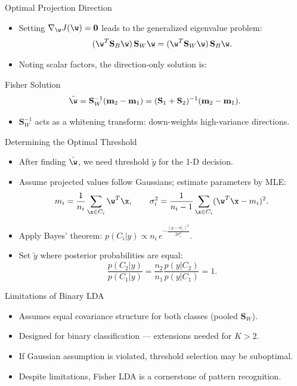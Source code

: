 \begin{frame}{Optimal Projection Direction}
  \begin{itemize}
    \item Setting $\nabla_{\w} J(\w) = \mathbf{0}$ leads to the generalized eigenvalue problem:
    \[
      (\w^T\mathbf{S}_B\w)\,\mathbf{S}_W\w = (\w^T\mathbf{S}_W\w)\,\mathbf{S}_B\w.
    \]
    \item Noting scalar factors, the direction-only solution is:
  \end{itemize}
  \begin{block}{Fisher Solution}
    \[
      \hat{\w} = \mathbf{S}_W^{-1}(\mathbf{m}_2 - \mathbf{m}_1) = (\mathbf{S}_1 + \mathbf{S}_2)^{-1}(\mathbf{m}_2 - \mathbf{m}_1).
    \]
  \end{block}
  \begin{itemize}
    \item $\mathbf{S}_W^{-1}$ acts as a \alert{whitening transform}: down-weights high-variance directions.
  \end{itemize}
\end{frame}

\begin{frame}{Determining the Optimal Threshold}
  \begin{itemize}
    \item After finding $\hat{\w}$, we need threshold $\tilde{y}$ for the 1-D decision.
    \item Assume projected values follow Gaussians; estimate parameters by MLE:
    \[
      m_i = \frac{1}{n_i}\sum_{\x \in C_i}\w^T\x, \qquad
      \sigma_i^2 = \frac{1}{n_i-1}\sum_{\x \in C_i}(\w^T\x - m_i)^2.
    \]
    \item Apply Bayes' theorem: $p(C_i|y) \propto n_i\,e^{-\frac{(y-m_i)^2}{2\sigma_i^2}}$.
    \item Set $\tilde{y}$ where posterior probabilities are equal:
    \[
      \frac{p(C_2|y)}{p(C_1|y)} = \frac{n_2}{n_1}\frac{p(y|C_2)}{p(y|C_1)} = 1.
    \]
  \end{itemize}
\end{frame}

\begin{frame}{Limitations of Binary LDA}
  \begin{itemize}
    \item Assumes \alert{equal covariance structure} for both classes (pooled $\mathbf{S}_W$).
    \item Designed for \alert{binary classification} — extensions needed for $K > 2$.
    \item If Gaussian assumption is violated, threshold selection may be suboptimal.
    \item Despite limitations, Fisher LDA is a cornerstone of pattern recognition.
  \end{itemize}
\end{frame}

